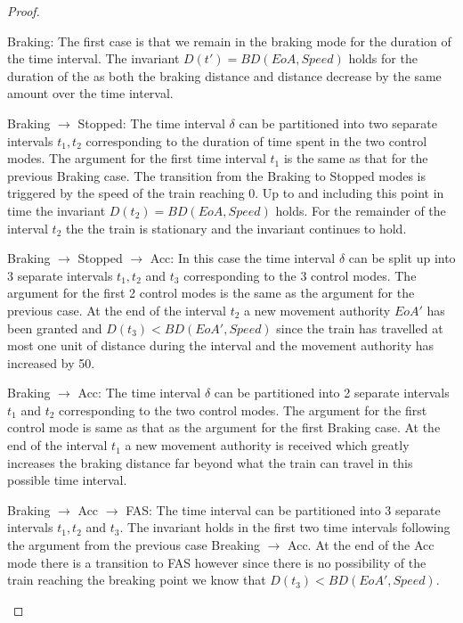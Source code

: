 \begin{mytheorem}
\begin{proof}
\begin{description}
Braking: The first case is that we remain in the braking mode for the duration of the time interval. The invariant $D(t') = BD(EoA,Speed)$ holds for the duration of the as both the braking distance and distance decrease by the same amount over the time interval.

Braking $\to$ Stopped: The time interval $\delta$ can be partitioned into two separate intervals $t_1,t_2$ corresponding to the duration of time spent in the two control modes.  The argument for the first time interval $t_1$ is the same as that for the previous Braking case. 
The transition from the Braking to Stopped modes is triggered by the speed of the train reaching 0. Up to and including this point in time the invariant $D(t_2) = BD(EoA, Speed)$ holds. For the remainder of the interval $t_2$ the the train is stationary and the invariant continues to hold. 

Braking $\to$ Stopped $\to$ Acc: In this case the time interval $\delta$ can be split up into 3 separate intervals $t_1,t_2$ and $t_3$ corresponding to the 3 control modes. The argument for the first 2 control modes is the same as the argument for the previous case. 
At the end of the interval $t_2$ a new movement authority $EoA'$ has been granted and $D(t_3) < BD(EoA', Speed)$ since the train  has travelled at most one unit of distance during the interval and the movement authority has increased by 50.

Braking $\to$ Acc:  The time interval $\delta$ can be partitioned into 2 separate intervals $t_1$ and $t_2$ corresponding to the two control modes. The argument for the first control mode is same as that as the argument for the first Braking case.  At the end of the interval $t_1$ a new movement authority is received which greatly increases the braking distance far beyond what the train can travel in this possible time interval.

Braking $\to$ Acc $\to$ FAS: The time interval can be partitioned into 3 separate intervals $t_1,t_2$ and $t_3$. The invariant holds in the first two time intervals following the argument from the previous case Breaking $\to$ Acc. At the end of the Acc mode there is a transition to FAS however since there is no possibility of the train reaching the breaking point we know that $D(t_3) < BD(EoA',Speed)$.



\end{description}



\end{proof}
\end{mytheorem}
